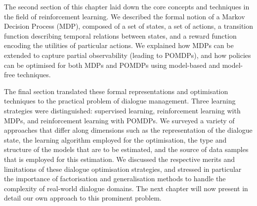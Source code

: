 The second section of this chapter laid down the core concepts and techniques in the field of reinforcement learning.  We described the formal notion of a Markov Decision Process (MDP), composed of a set of states, a set of actions, a transition function describing temporal relations between states, and a reward function encoding the utilities of particular actions. We explained how MDPs can be extended to capture partial observability (leading to POMDPs), and how policies can be optimised for both MDPs and POMDPs using model-based and model-free techniques.

The final section translated these formal representations and optimisation techniques to the practical problem of dialogue management.  Three learning strategies were distinguished: supervised learning, reinforcement learning with MDPs, and reinforcement learning with POMDPs.  We surveyed a variety of approaches that differ along dimensions such as the representation of the dialogue state, the learning algorithm employed for the optimisation, the type and structure of the models that are to be estimated, and the source of data samples that is employed for this estimation. We discussed the respective merits and limitations of these dialogue optimisation strategies, and stressed in particular the importance of factorisation and generalisation methods to handle the complexity of real-world dialogue domains.  The next chapter will now present in detail our own approach to this prominent problem.

